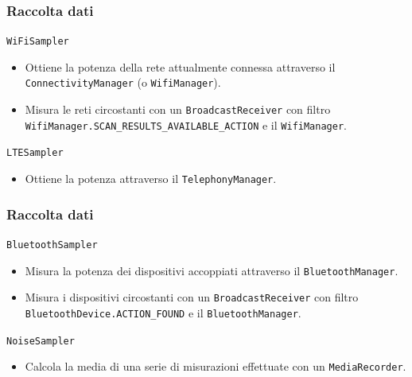 \documentclass{beamer}
\begin{document}
\begin{frame}
    \frametitle{Raccolta dati}

    \begin{block}{\texttt{WiFiSampler}}
        \begin{itemize}
            \item Ottiene la potenza della rete attualmente connessa attraverso il \texttt{ConnectivityManager} (o \texttt{WifiManager}).
            \item Misura le reti circostanti con un \texttt{BroadcastReceiver} con filtro \texttt{WifiManager.SCAN\_RESULTS\_AVAILABLE\_ACTION} e il \texttt{WifiManager}.
        \end{itemize}
    \end{block}

    \begin{block}{\texttt{LTESampler}}
        \begin{itemize}
            \item Ottiene la potenza attraverso il \texttt{TelephonyManager}.
        \end{itemize}
    \end{block}
\end{frame}

\begin{frame}
    \frametitle{Raccolta dati}

    \begin{block}{\texttt{BluetoothSampler}}
        \begin{itemize}
            \item Misura la potenza dei dispositivi accoppiati attraverso il \texttt{BluetoothManager}.
            \item Misura i dispositivi circostanti con un \texttt{BroadcastReceiver} con filtro \texttt{BluetoothDevice.ACTION\_FOUND} e il \texttt{BluetoothManager}.
        \end{itemize}
    \end{block}

    \begin{block}{\texttt{NoiseSampler}}
        \begin{itemize}
            \item Calcola la media di una serie di misurazioni effettuate con un \texttt{MediaRecorder}.
        \end{itemize}
    \end{block}
\end{frame}
\end{document}
